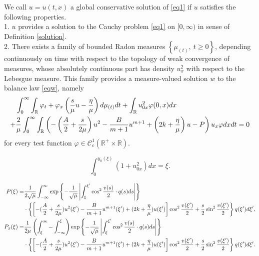 \documentclass[10pt,a4paper]{amsart}
\begin{document}
	\begin{defi}\label{conservative}
		We call $u=u(t,x)$ a global conservative solution of \eqref{eq1} if $u$ satisfies the following properties. \\
		1. $u$ provides a solution to the Cauchy problem \eqref{eq1} on $[0,\infty)$ in sense of Definition \ref{solution}.\\
		2. There exists a family of bounded Radon measures $\left\{\mu_{(t)},\ t\geq0\right\}$, depending continuously on time with respect to the topology of weak convergence of measures, whose absolutely continuous part has density $u_x^2$ with respect to the Lebesgue measure. This family provides a measure-valued solution $w$ to the balance law \eqref{eqw}, namely
		\begin{align}
			&\int_{0}^{\infty}\int_\mathbb{R}\varphi_t+\varphi_x\left(\frac{s}{\mu}u-\frac{\eta}{\mu}\right)d\mu_{(t)}dt+\int_{\mathbb{R}}u_{0x}^{2}\varphi(0,x)dx\notag\\
			+&\frac{2}{\mu}\int_{0}^{\infty}\int_\mathbb{R}\left(-\left(\frac{A}{2}+\frac{s}{2\mu}\right)u^2-\frac{B}{m+1}u^{m+1}+\left(2k+\frac{\eta}{\mu}\right)u-P\right)u_x\varphi dxdt=0\label{w}
		\end{align}
		for every test function $\varphi\in\mathcal{C}_c^1(\mathbb{R}^+\times\mathbb{R})$.
	\end{defi}

	\begin{equation}\label{y0}
		\int_0^{y_0(\xi)}(1+u_{0x}^2)dx=\xi.
	\end{equation}

	\begin{align}
		P(\xi) =&\frac{1}{2\sqrt{\mu}}\int_{-\infty}^{\infty}\exp\left\{-\frac{1}{\sqrt{\mu}}\left|\int_{\xi}^{\xi^{\prime}}\cos^{2}\frac{v(s)}{2}\cdot q(s)ds\right|\right\}\notag \\
		& \cdot\left\{\left[-(\frac{A}{2}+\frac{s}{2\mu})u^2(\xi^{\prime})-\frac{B}{m+1}u^{m+1}(\xi^{\prime})+(2k+\frac{\eta}{\mu})u(\xi^{\prime})\right]\cos^2\frac{v(\xi^{\prime})}{2}+\frac{s}{2}\sin^2\frac{v(\xi^{\prime})}{2}\right\}q(\xi^{\prime})d\xi^{\prime},\label{P}\\
		P_x(\xi) =&\frac{1}{2\mu}\left(\int_\xi^\infty-\int_{-\infty}^\xi\right)\exp\left\{-\frac{1}{\sqrt{\mu}}\left|\int_{\xi}^{\xi^{\prime}}\cos^{2}\frac{v(s)}{2}\cdot q(s)ds\right|\right\}\notag \\
		& \cdot\left\{\left[-(\frac{A}{2}+\frac{s}{2\mu})u^2(\xi^{\prime})-\frac{B}{m+1}u^{m+1}(\xi^{\prime})+(2k+\frac{\eta}{\mu})u(\xi^{\prime})\right]\cos^2\frac{v(\xi^{\prime})}{2}+\frac{s}{2}\sin^2\frac{v(\xi^{\prime})}{2}\right\}q(\xi^{\prime})d\xi^{\prime}.\label{Px}
	\end{align}
\end{document}

